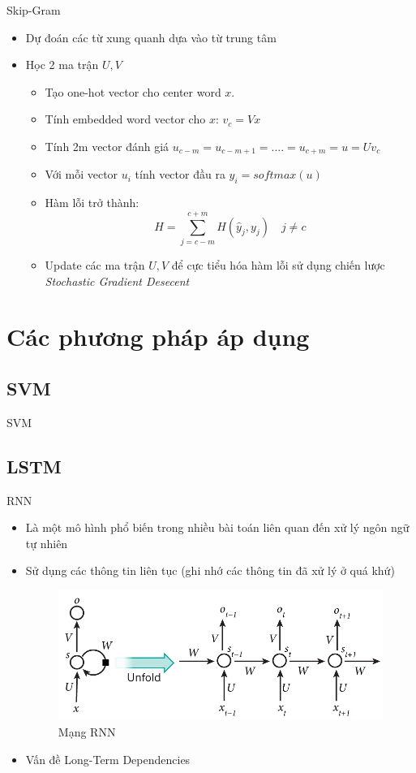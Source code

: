 \documentclass[compress]{beamer}
\begin{document}
\begin{frame}{Skip-Gram}
\begin{itemize}
\item Dự đoán các từ xung quanh dựa vào từ trung tâm
\item Học 2 ma trận $U,V$
\begin{itemize}
\item Tạo one-hot vector cho center word $x$.
\item Tính embedded word vector cho $x$: $v_c = Vx$
\item Tính 2m vector đánh giá $u_{c-m} = u_{c-m+1} = .... = u_{c+m} = u = Uv_c$
\item Với mỗi vector $u_i$ tính vector đầu ra $y_i = softmax(u)$
\item Hàm lỗi trở thành:
$$H = \sum_{j=c-m}^{c+m} H(\hat{y}_j,y_j) \quad j \neq c$$
\item Update các ma trận $U, V$ để cực tiểu hóa hàm lỗi sử dụng chiến lược \emph{Stochastic Gradient Desecent}
\end{itemize}
\end{itemize}
\end{frame}

\section{Các phương pháp áp dụng}
\subsection{SVM}
\begin{frame}{SVM}
\end{frame}

\subsection{LSTM}
\begin{frame}{RNN}
\begin{itemize}
\item Là một mô hình phổ biến trong nhiều bài toán liên quan đến xử lý ngôn ngữ tự nhiên
\item Sử dụng các thông tin liên tục (ghi nhớ các thông tin đã xử lý ở quá khứ) 
\begin{figure}[H]
\centering
\includegraphics[scale=0.3]{rnn.jpg}
\caption{Mạng RNN}
\end{figure}
 \item Vấn đề Long-Term Dependencies
\end{itemize}
\end{frame}
\end{document}
